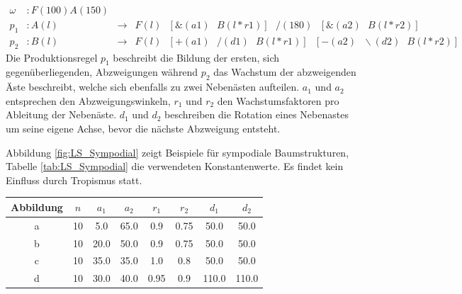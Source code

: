 \begin{equation}
\begin{array}{llll}
\omega & : F(100)A(150) \\
p_1 & : A(l) &\rightarrow& F(l)\text{ }[\&(a1)\text{ }B(l*r1)]\text{ }/(180)\text{ }[\&(a2)\text{ }B(l*r2)] \\
p_2 &  : B(l) &\rightarrow& F(l)\text{ }[+(a1)\text{ }/(d1)\text{ }B(l*r1)]\text{ }[-(a2)\text{ }\backslash(d2)\text{ }B(l*r2)]
\end{array}
\label{eq:ProdSympodial}
\end{equation} 
\cite[S.59]{ABOP:04}
Die Produktionsregel $p_1$ beschreibt die Bildung der ersten, sich gegenüberliegenden, Abzweigungen während $p_2$ das Wachstum der abzweigenden Äste beschreibt, welche sich ebenfalls zu zwei Nebenästen aufteilen. $a_1$ und $a_2$ entsprechen den Abzweigungswinkeln, $r_1$ und $r_2$ den Wachstumsfaktoren pro Ableitung der Nebenäste. $d_1$ und $d_2$ beschreiben die Rotation eines Nebenastes um seine eigene Achse, bevor die nächste Abzweigung entsteht.

Abbildung \ref{fig:LS_Sympodial} zeigt Beispiele für sympodiale Baumstrukturen, Tabelle \ref{tab:LS_Sympodial} die verwendeten Konstantenwerte. Es findet kein Einfluss durch Tropismus statt.

\begin{center}
	\begin{tabulary}{\textwidth}{|C|C|C|C|C|C|C|C|}
		\hline 
		Abbildung & $n$ & $a_1$ & $a_2$ & $r_1$ & $r_2$ & $d_1$ & $d_2$ \\ 
		\hline 
		a & 10 & 5.0 & 65.0 & 0.9 & 0.75 & 50.0 & 50.0 \\ 
		\hline 
		b & 10 & 20.0 & 50.0 & 0.9 & 0.75 & 50.0 & 50.0 \\ 
		\hline 
		c & 10 & 35.0 & 35.0 & 1.0 & 0.8 & 50.0 & 50.0 \\ 
		\hline 
		d & 10 & 30.0 & 40.0 & 0.95 & 0.9 & 110.0 & 110.0 \\ 
		\hline 
	\end{tabulary} 
	\label{tab:LS_Sympodial}
\end{center}

